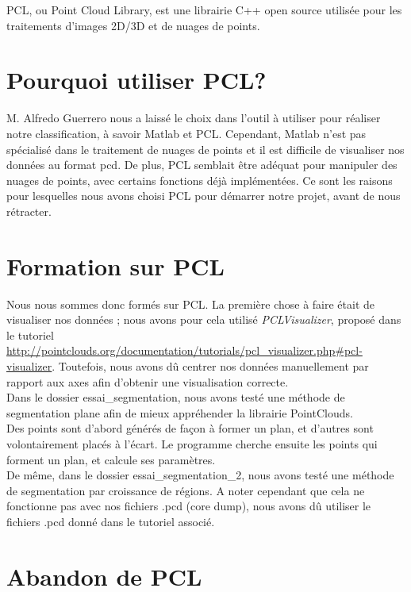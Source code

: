 PCL, ou Point Cloud Library, est une librairie C++ open source utilisée pour les traitements d'images 2D/3D et de nuages de points.\\

\section{Pourquoi utiliser PCL?}

M. Alfredo Guerrero nous a laissé le choix dans l'outil à utiliser pour réaliser notre classification, à savoir Matlab et PCL. Cependant, Matlab n'est pas spécialisé dans le traitement de nuages de points et il est difficile de visualiser nos données au format pcd. De plus, PCL semblait être adéquat pour manipuler des nuages de points, avec certains fonctions déjà implémentées. Ce sont les raisons pour lesquelles nous avons choisi PCL pour démarrer notre projet, avant de nous rétracter.\\

\section{Formation sur PCL}

	Nous nous sommes donc formés sur PCL. La première chose à faire était de visualiser nos données ; nous avons pour cela utilisé \emph{PCLVisualizer}, proposé dans le tutoriel \url{http://pointclouds.org/documentation/tutorials/pcl_visualizer.php#pcl-visualizer}. Toutefois, nous avons dû centrer nos données manuellement par rapport aux axes afin d'obtenir une visualisation correcte.\\

	Dans le dossier essai\_segmentation, nous avons testé une méthode de segmentation plane afin de mieux appréhender la librairie PointClouds.\\
	Des points sont d'abord générés de façon à former un plan, et d'autres sont volontairement placés à l'écart. Le programme cherche ensuite les points qui forment un plan, et calcule ses paramètres.\\

	De même, dans le dossier essai\_segmentation\_2, nous avons testé une méthode de segmentation par croissance de régions. A noter cependant que cela ne fonctionne pas avec nos fichiers .pcd (core dump), nous avons dû utiliser le fichiers .pcd donné dans le tutoriel associé.\\

\section{Abandon de PCL}

